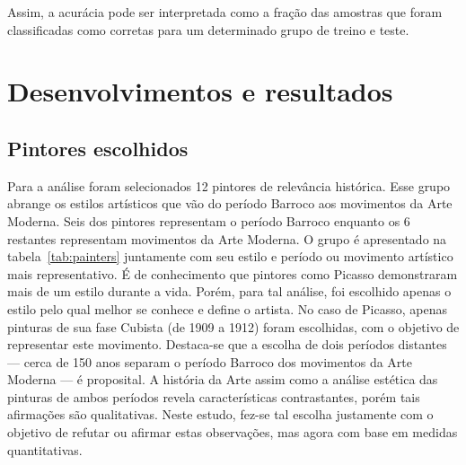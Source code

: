 Assim, a acurácia pode ser interpretada como a fração das amostras que
foram classificadas como corretas para um determinado grupo de treino
e teste.


\chapter{Desenvolvimentos e resultados}
\label{chap:resultados}


\section{Pintores escolhidos}

Para a análise foram selecionados 12 pintores de relevância
histórica. Esse grupo abrange os estilos artísticos que vão do período
Barroco aos movimentos da Arte Moderna. Seis dos pintores representam
o período Barroco enquanto os 6 restantes representam movimentos da
Arte Moderna. O grupo é apresentado na tabela~\ref{tab:painters}
juntamente com seu estilo e período ou movimento artístico mais
representativo. É de conhecimento que pintores como Picasso
demonstraram mais de um estilo durante a vida. Porém, para tal
análise, foi escolhido apenas o estilo pelo qual melhor se conhece e
define o artista. No caso de Picasso, apenas pinturas de sua fase
Cubista (de 1909 a 1912) foram escolhidas, com o objetivo de
representar este movimento. Destaca-se que a escolha de dois períodos
distantes --- cerca de 150 anos separam o período Barroco dos
movimentos da Arte Moderna --- é proposital. A história da Arte assim
como a análise estética das pinturas de ambos períodos revela
características contrastantes, porém tais afirmações são
qualitativas. Neste estudo, fez-se tal escolha justamente com o
objetivo de refutar ou afirmar estas observações, mas agora com base
em medidas quantitativas.

